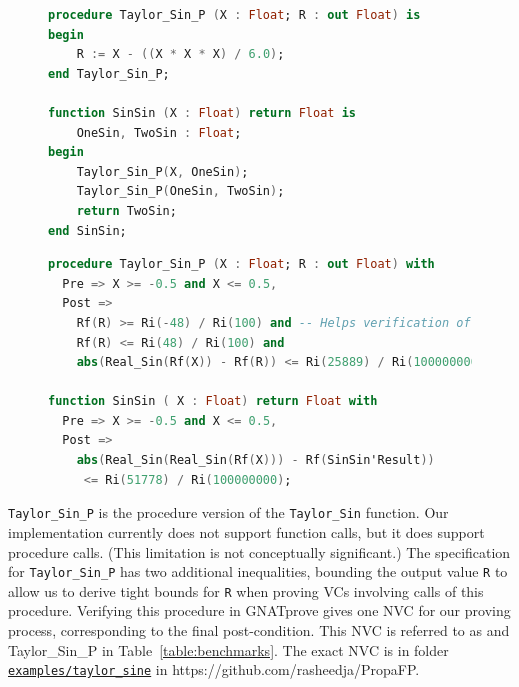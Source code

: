 \documentclass[runningheads]{llncs}
\begin{document}
\begin{figure}[ht]
\vspace{-2ex}
\begin{lstlisting}[caption=SinSin function definition in SPARK, language=ada, label={code:sinSinBody}]
procedure Taylor_Sin_P (X : Float; R : out Float) is
begin
    R := X - ((X * X * X) / 6.0);
end Taylor_Sin_P;

function SinSin (X : Float) return Float is
    OneSin, TwoSin : Float;
begin
    Taylor_Sin_P(X, OneSin);
    Taylor_Sin_P(OneSin, TwoSin);
    return TwoSin;
end SinSin;
\end{lstlisting}

\begin{lstlisting}[caption=SinSin function specification in SPARK, language=ada, label={code:sinSinSpec}]
procedure Taylor_Sin_P (X : Float; R : out Float) with
  Pre => X >= -0.5 and X <= 0.5,
  Post =>
    Rf(R) >= Ri(-48) / Ri(100) and -- Helps verification of calling functions
    Rf(R) <= Ri(48) / Ri(100) and       
    abs(Real_Sin(Rf(X)) - Rf(R)) <= Ri(25889) / Ri(100000000);

function SinSin ( X : Float) return Float with
  Pre => X >= -0.5 and X <= 0.5,
  Post =>
    abs(Real_Sin(Real_Sin(Rf(X))) - Rf(SinSin'Result))
     <= Ri(51778) / Ri(100000000);
\end{lstlisting}
\end{figure}

\lstinline{Taylor_Sin_P} is the procedure version of the \lstinline{Taylor_Sin} function. 
Our implementation currently does not support function calls, but it does support procedure calls. (This limitation is not conceptually significant.)
The specification for \lstinline{Taylor_Sin_P} has two additional inequalities, bounding the output value \lstinline{R} to allow us to derive tight bounds for \lstinline{R} when proving VCs involving calls of this procedure.
Verifying this procedure in GNATprove gives one NVC for our proving process, corresponding to the final post-condition.
This NVC is referred to as and Taylor\_Sin\_P in Table~\ref{table:benchmarks}.
The exact NVC is in folder \href{https://github.com/rasheedja/PropaFP/tree/master/examples/taylor_sine}{\texttt{examples/taylor\_sine}} in https://github.com/rasheedja/PropaFP.

\end{document}
